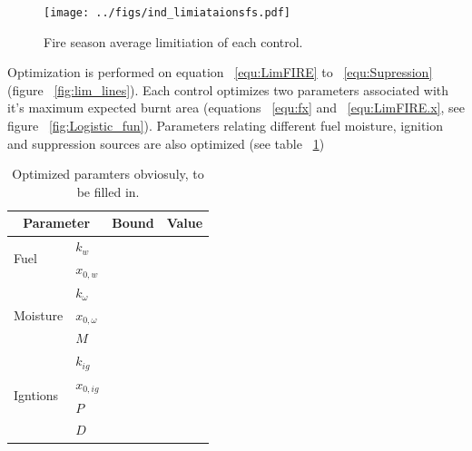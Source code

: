 \begin{figure}[!ht]
  \centering
    \texttt{[image: ../figs/ind\_limiataionsfs.pdf]}
  \caption{Fire season average limitiation of each control.}
  \label{fig:Season_con}
\end{figure}

Optimization is performed on equation ~\ref{equ:LimFIRE} to ~\ref{equ:Supression} (figure ~\ref{fig:lim_lines}). Each control optimizes two parameters associated with it's maximum expected burnt area (equations ~\ref{equ:fx} and ~\ref{equ:LimFIRE.x}, see figure ~\ref{fig:Logistic_fun}).
Parameters relating different fuel moisture, ignition and suppression sources are also optimized (see table ~\ref{tab:optimize})

\begin{table}[]
\centering
\caption{Optimized paramters obviosuly, to be filled in.}
\label{tab:optimize}
\begin{tabular}{llll}
\hline
\multicolumn{2}{c}{\textbf{Parameter}} & \multicolumn{1}{c}{\textbf{Bound}} & \multicolumn{1}{c}{\textbf{Value}} \\ \hline
\multirow{2}{*}{Fuel}             & $k_{w}$         &                                    &                                    \\
                                  & $x_{0,w}$       &                                    &                                    \\ \hline
\multirow{3}{*}{Moisture}         & $k_{\omega}$    &                                    &                                    \\
                                  & $x_{0, \omega}$ &                                    &                                    \\
                                  & $M$             &                                    &                                    \\ \hline
\multirow{4}{*}{Igntions}         & $k_{ig}$        &                                    &                                    \\
                                  & $x_{0, ig}$     &                                    &                                    \\
                                  & $P$             &                                    &                                    \\
                                  & $D$             &                                    &                                    \\ \hline

\end{tabular}
\end{table}
